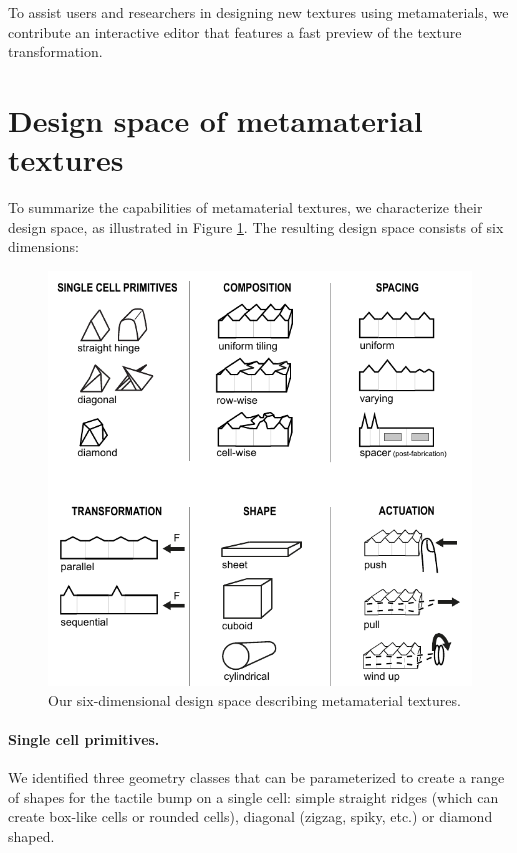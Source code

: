 To assist users and researchers in designing new textures using metamaterials, we contribute an interactive editor that features a fast preview of the texture transformation.


\section{Design space of metamaterial textures}

To summarize the capabilities of metamaterial textures, we characterize their design space, as illustrated in Figure \ref{fig:7-design-space}. The resulting design space consists of six dimensions:

\begin{figure} [h]  
    \includegraphics[width=\textwidth]{chapters/metamaterial-textures-FIG/7-design-space.pdf}
    \caption[Short figure name.]{Our six-dimensional design space describing metamaterial textures.
    \label{fig:7-design-space}}
\end{figure}

\paragraph{Single cell primitives.} We identified three geometry classes that can be parameterized to create a range of shapes for the tactile bump on a single cell: simple straight ridges (which can create box-like cells or rounded cells), diagonal (zigzag, spiky, etc.) or diamond shaped.

